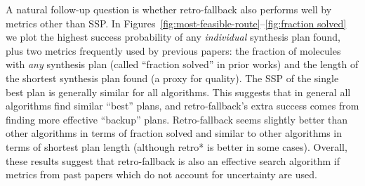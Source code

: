 A natural follow-up question is whether retro-fallback also performs well by metrics other than SSP.
In Figures~\ref{fig:most-feasible-route}--\ref{fig:fraction solved}
we plot the highest success probability of any \emph{individual} synthesis plan found,
plus two metrics frequently used by previous papers: the fraction of molecules with \emph{any} synthesis plan (called ``fraction solved'' in prior works) and
the length of the shortest synthesis plan found (a proxy for quality).
The SSP of the single best plan is generally similar for all algorithms.
This suggests that in general all algorithms find similar ``best'' plans,
and retro-fallback's extra success comes from finding more effective ``backup'' plans.
Retro-fallback seems slightly better than other algorithms in terms of fraction solved
and similar to other algorithms in terms of shortest plan length (although retro* is better in some cases).
Overall, these results suggest that retro-fallback is also an effective search algorithm if metrics from past papers which do not account for uncertainty are used.
